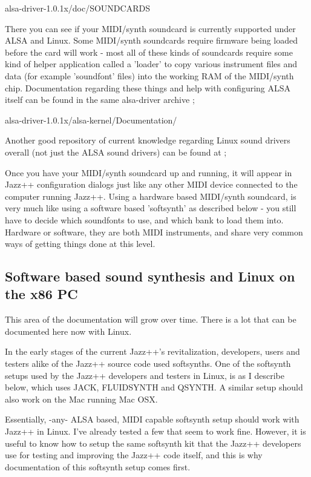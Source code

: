 \documentclass[letterpaper]{report}
\begin{document}
alsa-driver-1.0.1x/doc/SOUNDCARDS

There you can see if your MIDI/synth soundcard is currently supported
under ALSA and Linux. Some MIDI/synth soundcards require firmware being
loaded before the card will work - most all of these kinds of soundcards
require some kind of helper application called a 'loader' to copy various
instrument files and data (for example 'soundfont' files) into the working
RAM of the MIDI/synth chip. Documentation regarding these things and help
with configuring ALSA itself can be found in the same alsa-driver archive ;

alsa-driver-1.0.1x/alsa-kernel/Documentation/


Another good repository of current knowledge regarding Linux sound drivers
overall (not just the ALSA sound drivers) can be found at ;


Once you have your MIDI/synth soundcard up and running, it will appear
in Jazz++ configuration dialogs just like any other MIDI device connected
to the computer running Jazz++. Using a hardware based MIDI/synth soundcard,
is very much like using a software based 'softsynth' as described below -
you still have to decide which soundfonts to use, and which bank to load them
into. Hardware or software, they are both MIDI instruments, and share very
common ways of getting things done at this level.




\subsection{Software based sound synthesis and Linux on the x86 PC}

This area of the documentation will grow over time. There is a lot
that can be documented here now with Linux.

In the early stages of the current Jazz++'s revitalization, developers,
users and testers alike of the Jazz++ source code used softsynths. One
of the softsynth setups used by the Jazz++ developers and testers in Linux,
is as I describe below, which uses JACK, FLUIDSYNTH and QSYNTH. A similar
setup should also work on the Mac running Mac OSX.

Essentially, -any- ALSA based, MIDI capable softsynth setup should work
with Jazz++ in Linux. I've already tested a few that seem to work fine.
However, it is useful to know how to setup the same softsynth kit that
the Jazz++ developers use for testing and improving the Jazz++ code itself,
and this is why documentation of this softsynth setup comes first.
\end{document}
